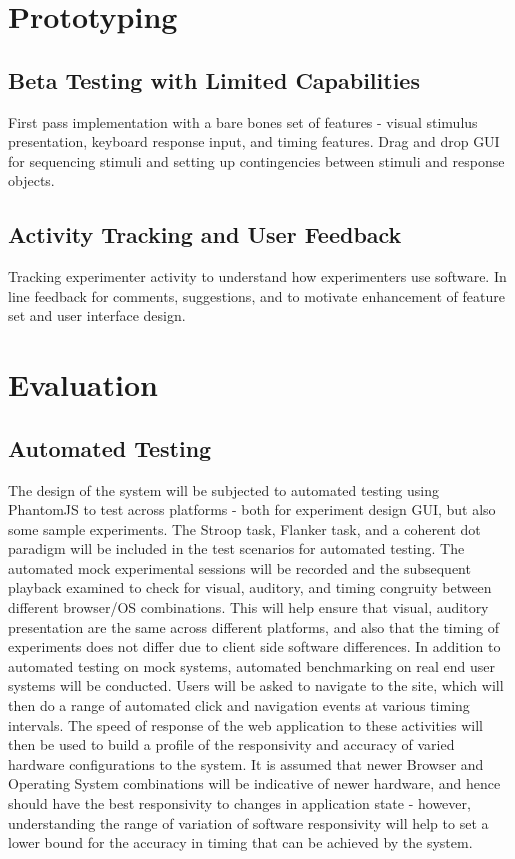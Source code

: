 \documentclass[12pt,a4paper,titlepage]{scrreprt}
\begin{document}
\section{Prototyping}
\subsection{Beta Testing with Limited Capabilities}
First pass implementation with a bare bones set of features - visual stimulus presentation, keyboard response input, and timing features. Drag and drop GUI for sequencing stimuli and setting up contingencies between stimuli and response objects.
\subsection{Activity Tracking and User Feedback}
Tracking experimenter activity to understand how experimenters use software. In line feedback for comments, suggestions, and to motivate enhancement of feature set and user interface design.
\section{Evaluation}
\subsection{Automated Testing}
The design of the system will be subjected to automated testing using PhantomJS\cite{_phantomjs_????} to test across platforms - both for experiment design GUI, but also some sample experiments. The Stroop task, Flanker task, and a coherent dot paradigm will be included in the test scenarios for automated testing. The automated mock experimental sessions  will be recorded and the subsequent playback examined to check for visual, auditory, and timing congruity between different browser/OS combinations. This will help ensure that visual, auditory presentation are the same across different platforms, and also that the timing of experiments does not differ due to client side software differences.
In addition to automated testing on mock systems, automated benchmarking on real end user systems will be conducted. Users will be asked to navigate to the site, which will then do a range of automated click and navigation events at various timing intervals. The speed of response of the web application to these activities will then be used to build a profile of the responsivity and accuracy of varied hardware configurations to the system. It is assumed that newer Browser and Operating System combinations will be indicative of newer hardware, and hence should have the best responsivity to changes in application state - however, understanding the range of variation of software responsivity will help to set a lower bound for the accuracy in timing that can be achieved by the system.
\end{document}
